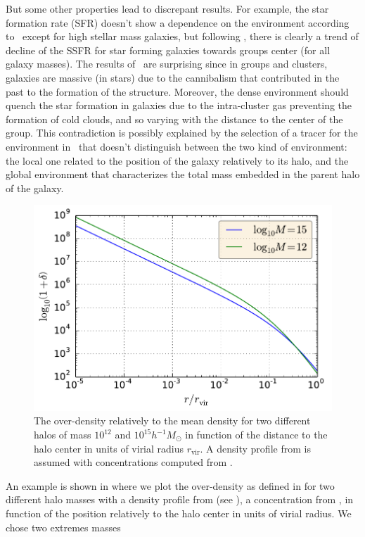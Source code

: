But some other properties lead to discrepant results. For example, the star
formation rate (SFR) doesn't show a dependence on the environment according
to~\cite{Peng+10} except for high stellar mass galaxies, but following
\citet{vonderLinden+10}, there is clearly a trend of decline of the SSFR for
star forming galaxies towards groups center (for all galaxy masses). The
results of~\cite{Peng+10} are surprising since in groups and clusters, galaxies
are massive (in stars) due to the cannibalism that contributed in the past to
the formation of the structure. Moreover, the dense environment should quench
the star formation in galaxies due to the intra-cluster gas preventing the
formation of cold clouds, and so varying with the distance to the center of the
group. This contradiction is possibly explained by the selection of a tracer
for the environment in~\cite{Peng+10} that doesn't distinguish between the two
kind of environment: the local one related to the position of the galaxy
relatively to its halo, and the global environment that characterizes the total
mass embedded in the parent halo of the galaxy.
%
\begin{figure}[htb]
    \centering
    \includegraphics[width=0.6\linewidth]{figures/introduction/overdensity.pdf}
    \caption{The over-density relatively to the mean density for two different
        halos of mass $10^{12}$ and $10^{15} h^{-1} M_\odot$ in function of the
        distance to the halo center in units of virial radius $r_\mathrm{vir}$.
        A density profile from \citet{NFW+97} is assumed with concentrations
    computed from \citet{Maccio+08}.\label{fig:overdensity}}
\end{figure}
%
An example is shown in  where we plot the
over-density as defined in \citet{Peng+10} for two different halo masses with a
density profile from \citet{NFW+97} (see ), a
concentration from \citet{Maccio+08}, in function of the position relatively to
the halo center in units of virial radius. We chose two extremes masses
